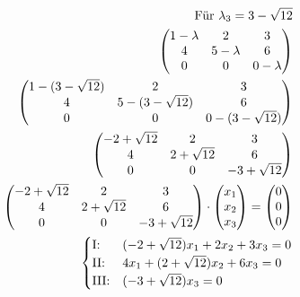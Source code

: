 \begin{align*}
    \text{Für } \lambda_3 = 3 - \sqrt{12}                           \\
    \begin{pmatrix}
        1 - \lambda & 2           & 3           \\
        4           & 5 - \lambda & 6           \\
        0           & 0           & 0 - \lambda
    \end{pmatrix}                         \\
    \begin{pmatrix}
        1 - (3 - \sqrt{12}) & 2                   & 3                   \\
        4                   & 5 - (3 - \sqrt{12}) & 6                   \\
        0                   & 0                   & 0 - (3 - \sqrt{12})
    \end{pmatrix} \\
    \begin{pmatrix}
        -2 + \sqrt{12} & 2             & 3              \\
        4              & 2 + \sqrt{12} & 6              \\
        0              & 0             & -3 + \sqrt{12}
    \end{pmatrix}                 \\
    \begin{pmatrix}
        -2 + \sqrt{12} & 2             & 3              \\
        4              & 2 + \sqrt{12} & 6              \\
        0              & 0             & -3 + \sqrt{12}
    \end{pmatrix} \cdot \begin{pmatrix}
                            x_1 \\ x_2 \\ x_3
                        \end{pmatrix} = \begin{pmatrix}
                                            0 \\ 0 \\ 0
                                        \end{pmatrix}              \\
    \begin{cases}
        \text{I:\@}   & (-2 + \sqrt{12})x_1 + 2x_2 + 3x_3 = 0 \\
        \text{II:\@}  & 4x_1 + (2 + \sqrt{12})x_2 + 6x_3 = 0  \\
        \text{III:\@} & (-3 + \sqrt{12})x_3 = 0
    \end{cases}
\end{align*}

